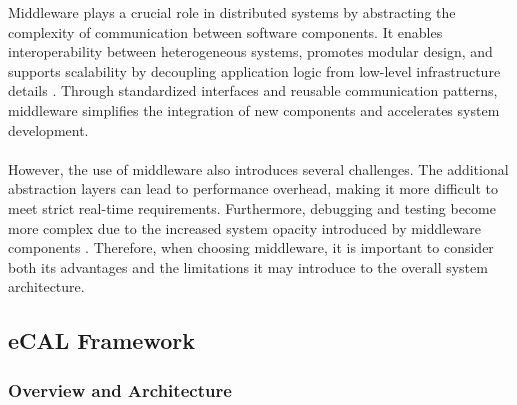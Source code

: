 Middleware plays a crucial role in distributed systems by abstracting the complexity of communication between software components. It enables interoperability between heterogeneous systems, promotes modular design, and supports scalability by decoupling application logic from low-level infrastructure details \cite{josuttis2007, coulouris2012}. Through standardized interfaces and reusable communication patterns, middleware simplifies the integration of new components and accelerates system development.
\\
\\
However, the use of middleware also introduces several challenges. The additional abstraction layers can lead to performance overhead, making it more difficult to meet strict real-time requirements. Furthermore, debugging and testing become more complex due to the increased system opacity introduced by middleware components \cite{josuttis2007, coulouris2012}. Therefore, when choosing middleware, it is important to consider both its advantages and the limitations it may introduce to the overall system architecture.





\subsection{eCAL Framework}

\subsubsection{Overview and Architecture}

